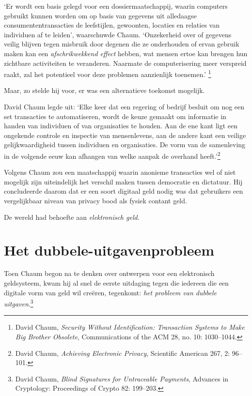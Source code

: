 \documentclass[
  a5paper,
  smalldemyvopaper,11pt,twoside,onecolumn,openright,extrafontsizes,
hidelinks]{memoir}
\begin{document}
`Er wordt een basis gelegd voor een dossiermaatschappij, waarin
computers gebruikt kunnen worden om op basis van gegevens uit alledaagse
consumententransacties de leefstijlen, gewoonten, locaties en relaties
van individuen af te leiden', waarschuwde Chaum. `Onzekerheid over of
gegevens veilig blijven tegen misbruik door degenen die ze onderhouden
of ervan gebruik maken kan een \emph{afschrikwekkend effect} hebben, wat
mensen ertoe kan brengen hun zichtbare activiteiten te veranderen.
Naarmate de computerisering meer verspreid raakt, zal het potentieel
voor deze problemen aanzienlijk toenemen.' \footnote{David Chaum,
  \emph{Security Without Identification: Transaction Systems to Make Big
  Brother Obsolete}, Communications of the ACM 28, no. 10: 1030--1044.}

Maar, zo stelde hij voor, er was een alternatieve toekomst mogelijk.

David Chaum legde uit: `Elke keer dat een regering of bedrijf besluit om
nog een set transacties te automatiseren, wordt de keuze gemaakt om
informatie in handen van individuen of van organisaties te houden. Aan
de ene kant ligt een ongekende controle en inspectie van mensenlevens,
aan de andere kant een veilige gelijkwaardigheid tussen individuen en
organisaties. De vorm van de samenleving in de volgende eeuw kan
afhangen van welke aanpak de overhand heeft.'\footnote{David Chaum,
  \emph{Achieving Electronic Privacy}, Scientific American 267, 2:
  96--101.}

Volgens Chaum zou een maatschappij waarin anonieme transacties wel of
niet mogelijk zijn uiteindelijk het verschil maken tussen democratie en
dictatuur. Hij concludeerde daarom dat er een soort digitaal geld nodig
was dat gebruikers een vergelijkbaar niveau van privacy bood als fysiek
contant geld.

De wereld had behoefte aan \emph{elektronisch geld}.

\section{Het
dubbele-uitgavenprobleem}\label{het-dubbele-uitgavenprobleem}

Toen Chaum begon na te denken over ontwerpen voor een elektronisch
geldsysteem, kwam hij al snel de eerste uitdaging tegen die iedereen die
een digitale vorm van geld wil creëren, tegenkomt: \emph{het probleem
van dubbele uitgaven}.\footnote{David Chaum, \emph{Blind Signatures for
  Untraceable Payments}, Advances in Cryptology: Proceedings of Crypto
  82: 199--203.}
\end{document}
